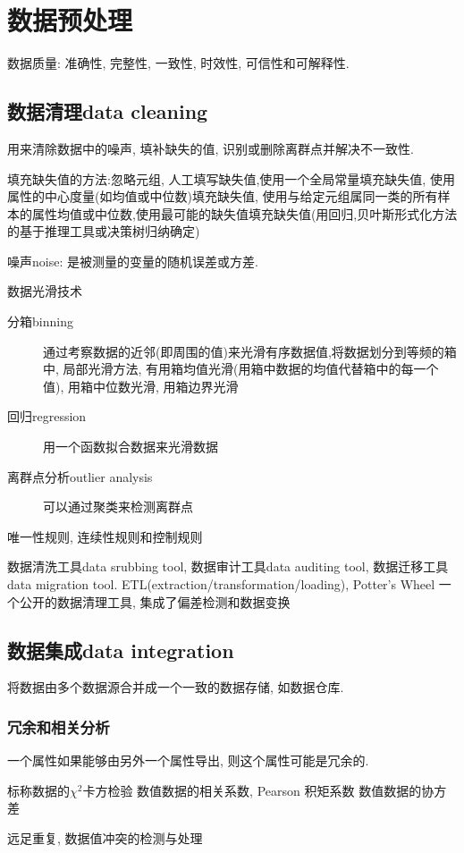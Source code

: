 \documentclass{article}
\begin{document}
\section{数据预处理}
数据质量: 准确性, 完整性, 一致性, 时效性, 可信性和可解释性.

\subsection{数据清理data cleaning}
用来清除数据中的噪声, 填补缺失的值, 识别或删除离群点并解决不一致性.

填充缺失值的方法:忽略元组, 人工填写缺失值,使用一个全局常量填充缺失值, 使用属性的中心度量(如均值或中位数)填充缺失值, 使用与给定元组属同一类的所有样本的属性均值或中位数,使用最可能的缺失值填充缺失值(用回归,贝叶斯形式化方法的基于推理工具或决策树归纳确定)

噪声noise: 是被测量的变量的随机误差或方差.

数据光滑技术
\begin{description}
	\item [分箱binning] 通过考察数据的近邻(即周围的值)来光滑有序数据值,将数据划分到等频的箱中, 局部光滑方法, 有用箱均值光滑(用箱中数据的均值代替箱中的每一个值), 用箱中位数光滑, 用箱边界光滑
	\item [回归regression] 用一个函数拟合数据来光滑数据
	\item [离群点分析outlier analysis] 可以通过聚类来检测离群点
\end{description}

唯一性规则, 连续性规则和控制规则

数据清洗工具data srubbing tool, 数据审计工具data auditing tool, 数据迁移工具data migration tool. ETL(extraction/transformation/loading), Potter's Wheel 一个公开的数据清理工具, 集成了偏差检测和数据变换

\subsection{数据集成data integration}
将数据由多个数据源合并成一个一致的数据存储, 如数据仓库.
\subsubsection{冗余和相关分析}
一个属性如果能够由另外一个属性导出, 则这个属性可能是冗余的.

标称数据的$\chi^2$卡方检验
数值数据的相关系数, Pearson 积矩系数
数值数据的协方差

远足重复, 数据值冲突的检测与处理
\end{document}
